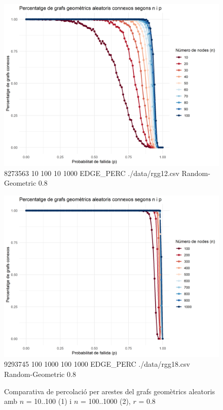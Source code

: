\documentclass[a4paper]{article}
\begin{document}
	\begin{figure}[H]
		\centering
		\begin{minipage}{0.45\textwidth}
			\centering
			\includegraphics[width=\textwidth]{images/randomGeometric_10-100_0.8}
			\footnotesize{8273563 10 100 10 1000 EDGE\_PERC ./data/rgg12.csv Random-Geometric 0.8}
		\end{minipage}
		\hfill
		\begin{minipage}{0.45\textwidth}
			\centering
			\includegraphics[width=\textwidth]{images/randomGeometric_100-1000_0.8}
			\footnotesize{9293745 100 1000 100 1000 EDGE\_PERC ./data/rgg18.csv Random-Geometric 0.8}
		\end{minipage}
		\caption{Comparativa de percolació per arestes del grafs geomètrics aleatoris amb $n$ = 10..100 (1) i $n$ = 100..1000 (2), $r$ = 0.8}
		\label{fig:percolation_edges_rgg_0.8}
	\end{figure}
	
\end{document}
